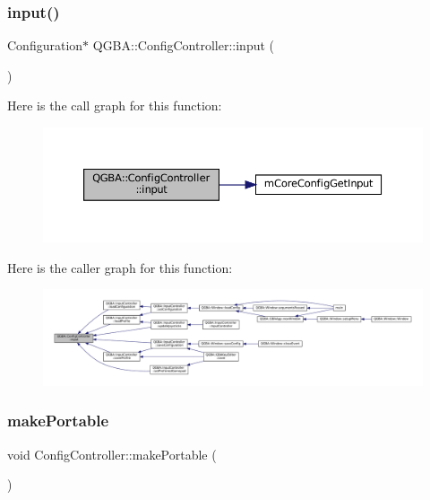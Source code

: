 \subsubsection{\texorpdfstring{input()}{input()}}
{\footnotesize\ttfamily Configuration$\ast$ Q\+G\+B\+A\+::\+Config\+Controller\+::input (\begin{DoxyParamCaption}{ }\end{DoxyParamCaption})\hspace{0.3cm}{\ttfamily [inline]}}

Here is the call graph for this function\+:
\nopagebreak
\begin{figure}[H]
\begin{center}
\leavevmode
\includegraphics[width=350pt]{class_q_g_b_a_1_1_config_controller_a301b9fdaa174ea02f2a04d8be86a80c4_cgraph}
\end{center}
\end{figure}
Here is the caller graph for this function\+:
\nopagebreak
\begin{figure}[H]
\begin{center}
\leavevmode
\includegraphics[width=350pt]{class_q_g_b_a_1_1_config_controller_a301b9fdaa174ea02f2a04d8be86a80c4_icgraph}
\end{center}
\end{figure}
\mbox{\label{class_q_g_b_a_1_1_config_controller_af7cecd2d1e8b2c9f631d3b2cc47aec5f}} 
\subsubsection{\texorpdfstring{make\+Portable}{makePortable}}
{\footnotesize\ttfamily void Config\+Controller\+::make\+Portable (\begin{DoxyParamCaption}{ }\end{DoxyParamCaption})\hspace{0.3cm}{\ttfamily [slot]}}

